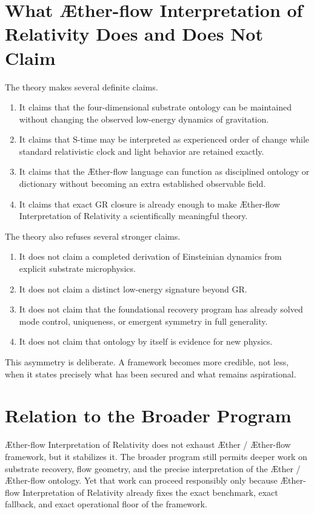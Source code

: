 \documentclass[11pt]{article}
\newcommand{\Aether}{\AE{}ther}
\newcommand{\Aflow}{\AE{}ther-flow}
\newcommand{\TheoryName}{\Aflow{} Interpretation of Relativity}
\newcommand{\TheoryProgram}{\Aether{} / \Aflow{} framework}
\begin{document}
\section{What \TheoryName{} Does and Does Not Claim}

The theory makes several definite claims.
\begin{enumerate}
    \item It claims that the four-dimensional substrate ontology can be maintained without changing the observed low-energy dynamics of gravitation.
    \item It claims that S-time may be interpreted as experienced order of change while standard relativistic clock and light behavior are retained exactly.
    \item It claims that the \Aflow{} language can function as disciplined ontology or dictionary without becoming an extra established observable field.
    \item It claims that exact GR closure is already enough to make \TheoryName{} a scientifically meaningful theory.
\end{enumerate}

The theory also refuses several stronger claims.
\begin{enumerate}
    \item It does not claim a completed derivation of Einsteinian dynamics from explicit substrate microphysics.
    \item It does not claim a distinct low-energy signature beyond GR.
    \item It does not claim that the foundational recovery program has already solved mode control, uniqueness, or emergent symmetry in full generality.
    \item It does not claim that ontology by itself is evidence for new physics.
\end{enumerate}

This asymmetry is deliberate. A framework becomes more credible, not less, when it states precisely what has been secured and what remains aspirational.

\section{Relation to the Broader Program}

\TheoryName{} does not exhaust \TheoryProgram{}, but it stabilizes it. The broader program still permits deeper work on substrate recovery, flow geometry, and the precise interpretation of the \Aether{} / \Aflow{} ontology. Yet that work can proceed responsibly only because \TheoryName{} already fixes the exact benchmark, exact fallback, and exact operational floor of the framework.
\end{document}

